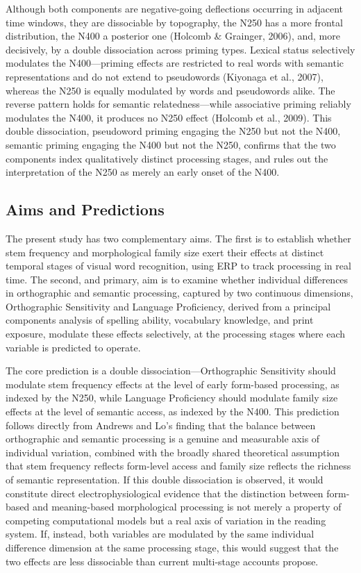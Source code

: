 \documentclass[utf8]{FrontiersinHarvard} %
\begin{document}
Although both components are negative-going deflections occurring in adjacent time windows, they are dissociable by topography, the N250 has a more frontal distribution, the N400 a posterior one (Holcomb \& Grainger, 2006), and, more decisively, by a double dissociation across priming types. Lexical status selectively modulates the N400—priming effects are restricted to real words with semantic representations and do not extend to pseudowords (Kiyonaga et al., 2007), whereas the N250 is equally modulated by words and pseudowords alike. The reverse pattern holds for semantic relatedness—while associative priming reliably modulates the N400, it produces no N250 effect (Holcomb et al., 2009). This double dissociation, pseudoword priming engaging the N250 but not the N400, semantic priming engaging the N400 but not the N250, confirms that the two components index qualitatively distinct processing stages, and rules out the interpretation of the N250 as merely an early onset of the N400.


\subsection{Aims and Predictions}

The present study has two complementary aims. The first is to establish whether stem frequency and morphological family size exert their effects at distinct temporal stages of visual word recognition, using ERP to track processing in real time. The second, and primary, aim is to examine whether individual differences in orthographic and semantic processing, captured by two continuous dimensions, Orthographic Sensitivity and Language Proficiency, derived from a principal components analysis of spelling ability, vocabulary knowledge, and print exposure, modulate these effects selectively, at the processing stages where each variable is predicted to operate.

The core prediction is a double dissociation—Orthographic Sensitivity should modulate stem frequency effects at the level of early form-based processing, as indexed by the N250, while Language Proficiency should modulate family size effects at the level of semantic access, as indexed by the N400. This prediction follows directly from Andrews and Lo's \citeyearpar{CITATION} finding that the balance between orthographic and semantic processing is a genuine and measurable axis of individual variation, combined with the broadly shared theoretical assumption that stem frequency reflects form-level access and family size reflects the richness of semantic representation. If this double dissociation is observed, it would constitute direct electrophysiological evidence that the distinction between form-based and meaning-based morphological processing is not merely a property of competing computational models but a real axis of variation in the reading system. If, instead, both variables are modulated by the same individual difference dimension at the same processing stage, this would suggest that the two effects are less dissociable than current multi-stage accounts propose.
\end{document}
